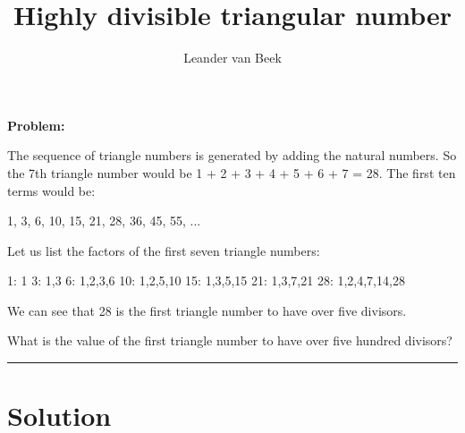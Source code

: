 \documentclass[10pt,a4paper]{article}
\author{Leander van Beek}
\title{Highly divisible triangular number}
\begin{document}
\maketitle

\textbf{Problem:} 

The sequence of triangle numbers is generated by adding the natural numbers. So the 7th triangle number would be 1 + 2 + 3 + 4 + 5 + 6 + 7 = 28. The first ten terms would be:

1, 3, 6, 10, 15, 21, 28, 36, 45, 55, ...

Let us list the factors of the first seven triangle numbers:

     1: 1
     3: 1,3
     6: 1,2,3,6
    10: 1,2,5,10
    15: 1,3,5,15
    21: 1,3,7,21
    28: 1,2,4,7,14,28

We can see that 28 is the first triangle number to have over five divisors.

What is the value of the first triangle number to have over five hundred divisors?


\vspace{0.5cm}
\hrule
\vspace{0.5cm}

\section{Solution}
\end{document}
